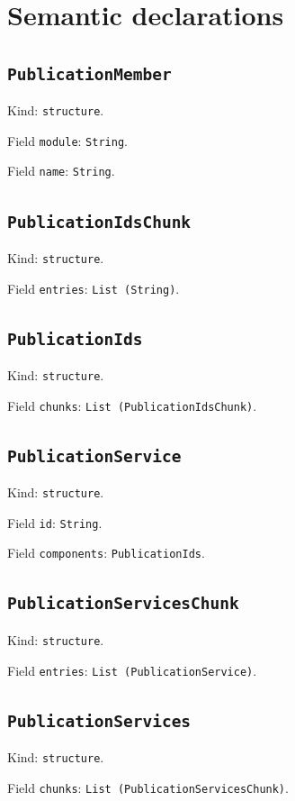 \documentclass[11pt]{article}
\begin{document}
\section*{Semantic declarations}
\subsection*{\texttt{PublicationMember}}
\noindent Kind: \texttt{structure}.\par
\noindent Field \texttt{module}: \texttt{String}.\par
\noindent Field \texttt{name}: \texttt{String}.\par
\subsection*{\texttt{PublicationIdsChunk}}
\noindent Kind: \texttt{structure}.\par
\noindent Field \texttt{entries}: \texttt{List (String)}.\par
\subsection*{\texttt{PublicationIds}}
\noindent Kind: \texttt{structure}.\par
\noindent Field \texttt{chunks}: \texttt{List (PublicationIdsChunk)}.\par
\subsection*{\texttt{PublicationService}}
\noindent Kind: \texttt{structure}.\par
\noindent Field \texttt{id}: \texttt{String}.\par
\noindent Field \texttt{components}: \texttt{PublicationIds}.\par
\subsection*{\texttt{PublicationServicesChunk}}
\noindent Kind: \texttt{structure}.\par
\noindent Field \texttt{entries}: \texttt{List (PublicationService)}.\par
\subsection*{\texttt{PublicationServices}}
\noindent Kind: \texttt{structure}.\par
\noindent Field \texttt{chunks}: \texttt{List (PublicationServicesChunk)}.\par
\end{document}
